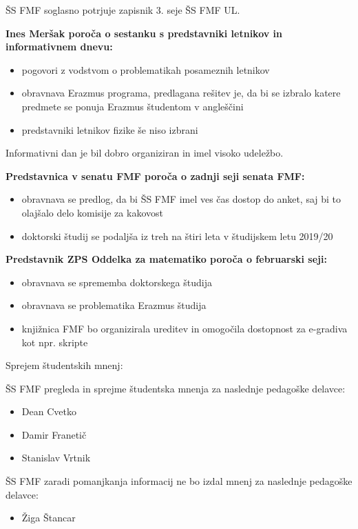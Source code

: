 \documentclass{seja}
\begin{document}
\begin{ad}
	
	\item
	ŠS FMF soglasno potrjuje zapisnik 3. seje ŠS FMF UL.
	
	\item 
	\textbf{Ines Meršak poroča o sestanku s predstavniki letnikov in informativnem dnevu:}
	 \begin{itemize}
	 	\item 
	 	pogovori z vodstvom o problematikah posameznih letnikov
	 	\item 
	 	obravnava Erazmus programa, predlagana rešitev je, da bi se izbralo katere predmete se ponuja Erazmus študentom v angleščini
	 	\item 
	 	predstavniki letnikov fizike še niso izbrani
	 \end{itemize}	
	Informativni dan je bil dobro organiziran in imel visoko udeležbo.
	
	
	\item
	\textbf{Predstavnica v senatu FMF poroča o zadnji seji senata FMF:}
	\begin{itemize}
		\item 
		obravnava se predlog, da bi ŠS FMF imel ves čas dostop do anket, saj bi to olajšalo delo komisije za kakovost
		\item 
		doktorski študij se podaljša iz treh na štiri leta v študijskem letu 2019/20
	\end{itemize}
	\textbf{Predstavnik ZPS Oddelka za matematiko poroča o februarski seji:}
	\begin{itemize}
		\item 
		obravnava se sprememba doktorskega študija
		\item 
		obravnava se problematika Erazmus študija
		\item 
		knjižnica FMF bo organizirala ureditev in omogočila dostopnost za e-gradiva kot npr. skripte
	\end{itemize}

	\item
		Sprejem študentskih mnenj:
	\begin{sklep}
		ŠS FMF pregleda in sprejme študentska mnenja za naslednje pedagoške delavce:
		\begin{itemize}
			\item Dean Cvetko
			\item Damir Franetič
			\item Stanislav Vrtnik
		\end{itemize}	
	\end{sklep}
	\begin{sklep}
    	ŠS FMF zaradi pomanjkanja informacij ne bo izdal mnenj za naslednje pedagoške delavce:
    	\begin{itemize}
    		\item Žiga Štancar
    	\end{itemize}	
	\end{sklep}
 

\end{ad}
\end{document}
